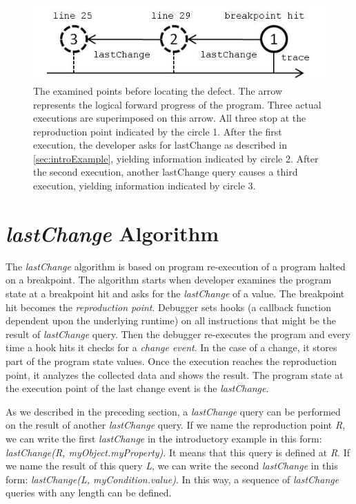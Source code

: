 \documentclass[runningheads,a4paper]{llncs}
\begin{document}
\begin{figure}[htp]
\centering 

\includegraphics{5-example-points.jpg}
\caption{The examined points before locating the defect. The arrow represents the logical forward progress of the program. Three actual executions are superimposed on this arrow. All three stop at the reproduction point indicated by the circle 1. After the first execution, the developer asks for lastChange as described in \ref{sec:introExample}, yielding information  indicated by circle 2. After the second execution, another lastChange query causes a third execution, yielding information indicated by circle 3.}
\label{fig:example-points}
\end{figure}



\section{\textit{lastChange} Algorithm}

The \textit{lastChange} algorithm is based on program re-execution of
a program halted on a breakpoint. The algorithm starts when developer
examines the program state at a breakpoint hit and asks for the
\textit{lastChange} of a value. The breakpoint hit becomes the
\textit{reproduction point}. Debugger sets hooks (a callback
function dependent upon the underlying runtime) on all instructions
that might be the result of \textit{lastChange} query. Then the
debugger re-executes the program and every time a hook hits it
checks for a \textit{change event}. In the case of a change, it stores
part of the program state values.  Once the execution reaches the
reproduction point, it analyzes the collected data and shows the
result.  The program state at the execution point of the last change
event is the \textit{lastChange}.


As we described in the preceding section, a \textit{lastChange} query can
be performed on the result of another \textit{lastChange} query. If we
name the reproduction point \textit{R}, we can write the first
\textit{lastChange} in the introductory example in this form:
\textit{lastChange(R, myObject.myProperty)}. It means that this query
is defined at \textit{R}. If we name the result of this query
\textit{L}, we can write the second \textit{lastChange} in this form:
\textit{lastChange(L, myCondition.value)}. In this way, a sequence of
\textit{lastChange} queries with any length can be defined. 
\end{document}
